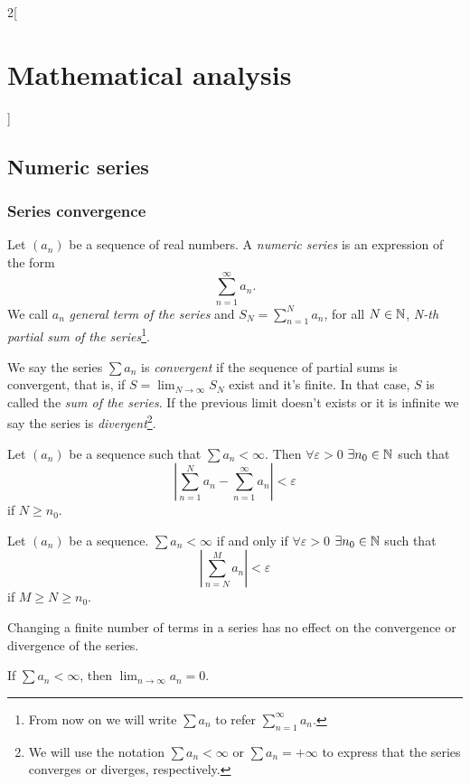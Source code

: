 \documentclass[../../../main.tex]{subfiles}
\begin{document}
\begin{multicols}{2}[\section{Mathematical analysis}]
\subsection{Numeric series}
\subsubsection*{Series convergence}
\begin{definition}
Let $(a_n)$ be a sequence of real numbers. A \textit{numeric series} is an expression of the form $$\sum_{n=1}^\infty a_n.$$ We call $a_n$ \textit{general term of the series} and $\displaystyle S_N=\sum_{n=1}^N a_n$, for all $N\in\mathbb{N} $, \textit{N-th partial sum of the series}\footnote{From now on we will write $\sum a_n$ to refer $\displaystyle\sum_{n=1}^\infty a_n$.}.
\end{definition}
\begin{definition}
We say the series $\sum a_n$ is \textit{convergent} if the sequence of partial sums is convergent, that is, if $\displaystyle S=\lim_{N\to\infty}S_N$ exist and it's finite. In that case, $S$ is called the \textit{sum of the series}. If the previous limit doesn't exists or it is infinite we say the series is \textit{divergent}\footnote{We will use the notation $\sum a_n<\infty$ or $\sum a_n=+\infty$ to express that the series converges or diverges, respectively.}.
\end{definition}
\begin{prop}
Let $(a_n)$ be a sequence such that $\sum a_n<\infty$. Then $\forall\varepsilon>0$ $\exists n_0\in\mathbb{N} $ such that $$\left|\sum_{n=1}^N a_n-\sum_{n=1}^\infty a_n\right|<\varepsilon$$ if $N\geq n_0$.
\end{prop}
\begin{theorem}
Let $(a_n)$ be a sequence. $\sum a_n<\infty$ if and only if $\forall\varepsilon>0$ $\exists n_0\in\mathbb{N} $ such that $$\left|\sum_{n=N}^Ma_n\right|<\varepsilon$$ if $M\geq N\geq n_0$.
\end{theorem}
\begin{corollary}
Changing a finite number of terms in a series has no effect on the convergence or divergence of the series.
\end{corollary}
\begin{corollary}
If $\sum a_n<\infty$, then $\displaystyle\lim_{n\to \infty} a_n=0$.

\end{corollary}
\end{multicols}
\end{document}
